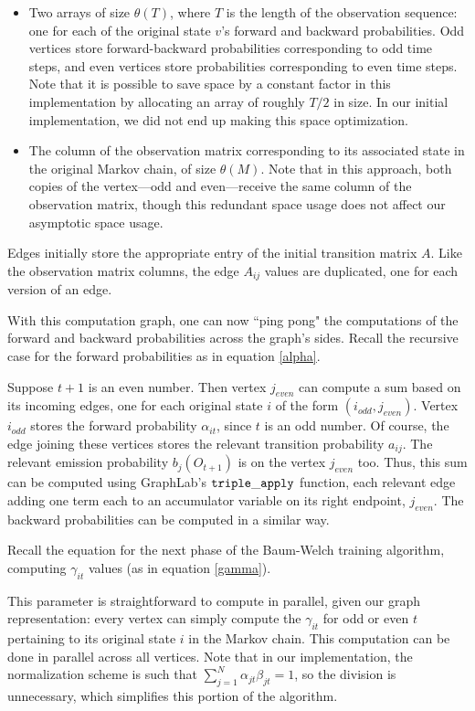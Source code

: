 \begin{itemize}
	\item Two arrays of size $\theta(T)$, where $T$ is the length of the observation sequence: one for each of the original state $v$'s forward and backward probabilities.  Odd vertices store forward-backward probabilities corresponding to odd time steps, and even vertices store probabilities corresponding to even time steps.  Note that it is possible to save space by a constant factor in this implementation by allocating an array of roughly $T/2$ in size.  In our initial implementation, we did not end up making this space optimization.  
	
	\item The column of the observation matrix corresponding to its associated state in the original Markov chain, of size $\theta(M)$.  Note that in this approach, both copies of the vertex---odd and even---receive the same column of the observation matrix, though this redundant space usage does not affect our asymptotic space usage.
\end{itemize}

Edges initially store the appropriate entry of the initial transition matrix $A$.  Like the observation matrix columns, the edge $A_{ij}$ values are duplicated, one for each version of an edge.

With this computation graph, one can now ``ping pong" the computations of the forward and backward probabilities across the graph's sides.  Recall the recursive case for the forward probabilities as in equation \ref{alpha}.

Suppose $t+1$ is an even number.  Then vertex $j_{even}$ can compute a sum based on its incoming edges, one for each original state $i$ of the form $(i_{odd}, j_{even})$.  Vertex $i_{odd}$ stores the forward probability $\alpha_{i t}$, since $t$ is an odd number.  Of course, the edge joining these vertices stores the relevant transition probability $a_{ij}$.  The relevant emission probability $b_j(O_{t + 1})$ is on the vertex $j_{even}$ too.  Thus, this sum can be computed using GraphLab's $\tt{triple\_apply}$ function, each relevant edge adding one term each to an accumulator variable on its right endpoint, $j_{even}$.  The backward probabilities can be computed in a similar way.

Recall the equation for the next phase of the Baum-Welch training algorithm, computing $\gamma_{it}$ values (as in equation \ref{gamma}).

This parameter is straightforward to compute in parallel, given our graph representation: every vertex can simply compute the $\gamma_{it}$ for odd or even $t$ pertaining to its original state $i$ in the Markov chain.  This computation can be done in parallel across all vertices.   Note that in our implementation, the normalization scheme is such that $\sum_{j = 1}^N \alpha_{jt}\beta_{jt} = 1$, so the division is unnecessary, which simplifies this portion of the algorithm.


